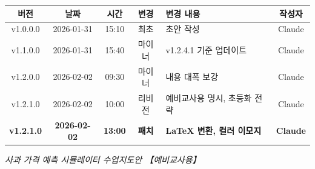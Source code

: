 \documentclass[11pt,a4paper]{article}
\begin{document}
\begin{center}
\small
\begin{tabular}{|c|c|c|c|p{4.5cm}|c|}
\hline
\textbf{버전} & \textbf{날짜} & \textbf{시간} & \textbf{변경} & \textbf{변경 내용} & \textbf{작성자} \\
\hline
v1.0.0.0 & 2026-01-31 & 15:10 & 최초 & 초안 작성 & Claude \\
\hline
v1.1.0.0 & 2026-01-31 & 15:40 & 마이너 & v1.2.4.1 기준 업데이트 & Claude \\
\hline
v1.2.0.0 & 2026-02-02 & 09:30 & 마이너 & 내용 대폭 보강 & Claude \\
\hline
v1.2.1.0 & 2026-02-02 & 10:00 & 리비전 & 예비교사용 명시, 초등화 전략 & Claude \\
\hline
\textbf{v1.2.1.0} & \textbf{2026-02-02} & \textbf{13:00} & \textbf{패치} & \textbf{LaTeX 변환, 컬러 이모지} & \textbf{Claude} \\
\hline
\end{tabular}
\end{center}

\vspace{1cm}
\begin{center}
\large\itshape
{} 사과 가격 예측 시뮬레이터 수업지도안 【예비교사용】
\end{center}
\end{document}
